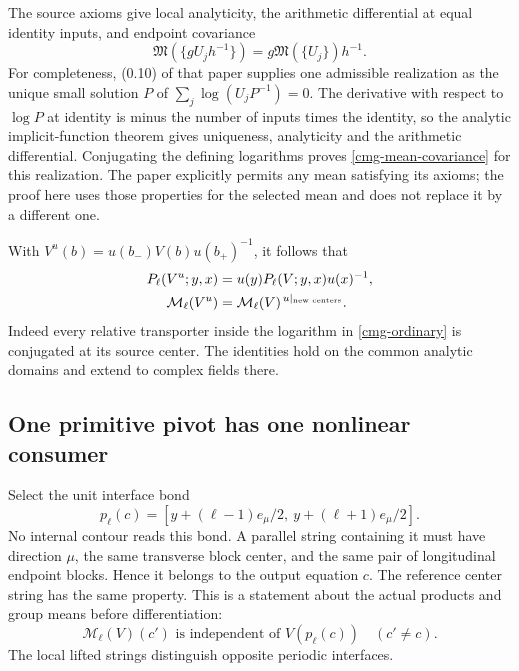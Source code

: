 The source axioms give local analyticity, the arithmetic differential
at equal identity inputs, and endpoint covariance
\begin{equation}
 \mathfrak M(\{gU_jh^{-1}\})=
 g\mathfrak M(\{U_j\})h^{-1}.
 \label{cmg-mean-covariance}
\end{equation}
For completeness, (0.10) of that paper supplies one admissible
realization as the unique small solution $P$ of
$\sum_j\log(U_jP^{-1})=0$. The derivative with respect to $\log P$ at
identity is minus the number of inputs times the identity, so the
analytic implicit-function theorem gives uniqueness, analyticity and
the arithmetic differential. Conjugating the defining logarithms
proves \eqref{cmg-mean-covariance} for this realization. The paper
explicitly permits any mean satisfying its axioms; the proof here
uses those properties for the selected mean and does not replace it
by a different one.

With $V^u(b)=u(b_-)V(b)u(b_+)^{-1}$, it follows that
\begin{align}
 P_\ell(V^u;y,x)&=u(y)P_\ell(V;y,x)u(x)^{-1},\notag\\
 \mathcal M_\ell(V^u)&=
       \mathcal M_\ell(V)^{\,u|_{\text{new centers}}}.
 \label{cmg-primitive-covariance}
\end{align}
Indeed every relative transporter inside the logarithm in
\eqref{cmg-ordinary} is conjugated at its source center. The identities
hold on the common analytic domains and extend to complex fields there.

\subsection{One primitive pivot has one nonlinear consumer}
\label{cmg-primitive-section}

Select the unit interface bond
\begin{equation}
 p_\ell(c)=
 [y+(\ell-1)e_\mu/2,\ y+(\ell+1)e_\mu/2].
 \label{cmg-primitive-pivot}
\end{equation}
No internal contour reads this bond. A parallel string containing it
must have direction $\mu$, the same transverse block center, and
the same pair of longitudinal endpoint blocks. Hence it belongs to
the output equation $c$. The reference center string has the same
property. This is a statement about the actual products and group
means before differentiation:
\begin{equation}
 \mathcal M_\ell(V)(c')\text{ is independent of }V(p_\ell(c))
 \quad(c'\ne c).
 \label{cmg-primitive-incidence}
\end{equation}
The local lifted strings distinguish opposite periodic interfaces.

